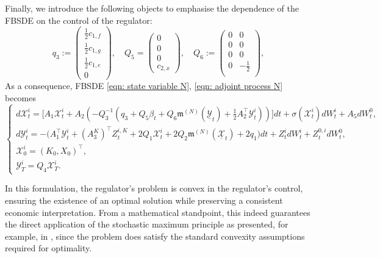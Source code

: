 \documentclass[11pt,twoside]{amsart}
\theoremstyle{definition}
\numberwithin{equation}{section}
\begin{document}
Finally, we introduce the following objects to emphasise the dependence of the FBSDE on the control of the regulator:
\begin{equation*}
q_3 := 
\begin{pmatrix}
\frac{1}{2}c_{1,f}\\
\frac{1}{2}c_{1,g}\\
\frac{1}{2}c_{1,e}\\
0
\end{pmatrix},\quad 
Q_5=
\begin{pmatrix}
0	\\
0	\\
0	\\
c_{2,x}
\end{pmatrix},
\quad Q_6 :=
\begin{pmatrix}
0	&0\\
0	&0\\
0	&0\\
0	&-\frac{1}{2}\\
\end{pmatrix},
\end{equation*}
As a consequence, FBSDE \eqref{eqn: state variable N}, \eqref{eqn: adjoint process N} becomes
\begin{equation}
\label{eqn: eq FBSDE company i}
\begin{cases}
d\mathcal{X}^i_t = \big[ A_1 \mathcal{X}^i_t + A_2( -Q_3^{-1} ( q_3 + Q_5{\beta}_t + Q_6\mathfrak{m}^{(N)}(\underline{\mathcal{Y}}_t)+ \frac{1}{2}A_2^\top \mathcal{Y}^i_t))\big] dt + \sigma(\mathcal{X}^i_t) dW^i_t + A_5dW^0_t,\\
d\mathcal{Y}^i_t = -\big( A_1^\top \mathcal{Y}^i_t + (A^K_3)^\top Z^{i,K}_t + 2Q_1\mathcal{X}^i_t + 2Q_2 \mathfrak{m}^{(N)}(\underline{\mathcal{X}}_t) + 2q_1 \big)dt + Z^i_t dW^i_t + Z^{0,i}_t dW^0_t ,\\
\mathcal{X}^i_0 = (K_0,X_0)^\top,\\
\mathcal{Y}^i_T = Q_4\mathcal{X}^i_T.
\end{cases}
\end{equation}


In this formulation, the regulator’s problem is convex in the regulator's control, ensuring the existence of an optimal solution while preserving a consistent economic interpretation. 
From a mathematical standpoint, this indeed guarantees the direct application of the stochastic maximum principle as presented, for example, in \cite[Appendix A]{fujii2022equilibrium}, since the problem does satisfy the standard convexity assumptions required for optimality.
\end{document}
